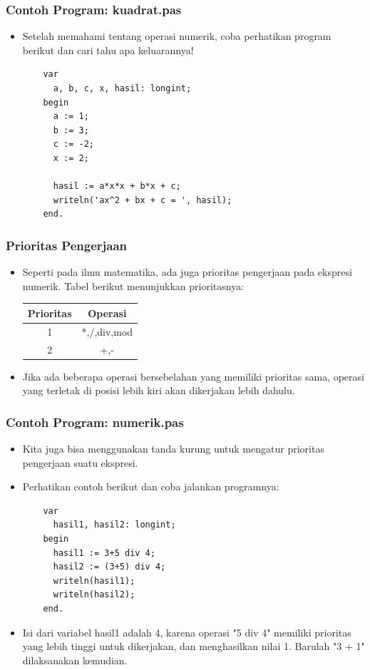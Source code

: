 \begin{frame}[fragile]
\frametitle{Contoh Program: kuadrat.pas}
\begin{itemize}
  \item Setelah memahami tentang operasi numerik, coba perhatikan program berikut dan cari tahu apa keluarannya!
  \begin{lstlisting}
    var
      a, b, c, x, hasil: longint;
    begin
      a := 1;
      b := 3;
      c := -2;
      x := 2;

      hasil := a*x*x + b*x + c;
      writeln('ax^2 + bx + c = ', hasil);
    end.
  \end{lstlisting}
\end{itemize}
\end{frame}

\begin{frame}
\frametitle{Prioritas Pengerjaan}
\begin{itemize}
  \item Seperti pada ilmu matematika, ada juga prioritas pengerjaan pada ekspresi numerik. Tabel berikut menunjukkan prioritasnya:

  \begin{tabular}{|c|c|}
  \hline Prioritas & Operasi \\
  \hline 1 & *,/,div,mod \\
  \hline 2 & +,- \\
  \hline
  \end{tabular}
  \item Jika ada beberapa operasi bersebelahan yang memiliki prioritas sama, operasi yang terletak di posisi lebih kiri akan dikerjakan lebih dahulu.
\end{itemize}
\end{frame}

\begin{frame}[fragile]
\frametitle{Contoh Program: numerik.pas}
\begin{itemize}
  \item Kita juga bisa menggunakan tanda kurung untuk mengatur prioritas pengerjaan suatu ekspresi.
  \item Perhatikan contoh berikut dan coba jalankan programnya:
  \begin{lstlisting}
    var
      hasil1, hasil2: longint;
    begin
      hasil1 := 3+5 div 4;
      hasil2 := (3+5) div 4;
      writeln(hasil1);
      writeln(hasil2);
    end.
  \end{lstlisting}
  \item Isi dari variabel hasil1 adalah 4, karena operasi "5 div 4" memiliki prioritas yang lebih tinggi untuk dikerjakan, dan menghasilkan nilai 1. Barulah "3 + 1" dilaksanakan kemudian.
\end{itemize}
\end{frame}

